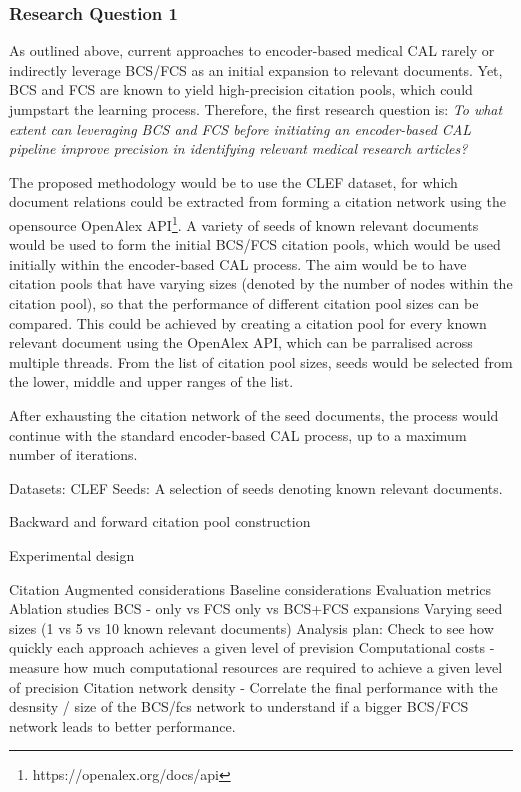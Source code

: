\documentclass[10pt, english]{article}
\begin{document}
\subsubsection{Research Question 1}

As outlined above, current approaches to encoder-based medical CAL rarely or indirectly leverage BCS/FCS as an initial expansion to relevant documents. Yet, BCS and FCS are known to yield high-precision citation pools, which could jumpstart the learning process. Therefore, the first research question is: {\it{To what extent can leveraging BCS and FCS before initiating an encoder-based CAL pipeline improve precision in identifying relevant medical research articles?}}

The proposed methodology would be to use the CLEF dataset, for which document relations could be extracted from forming a citation network using the opensource OpenAlex API\footnote{https://openalex.org/docs/api}. A variety of seeds of known relevant documents would be used to form the initial BCS/FCS citation pools, which would be used initially within the encoder-based CAL process. The aim would be to have citation pools that have varying sizes (denoted by the number of nodes within the citation pool), so that the performance of different citation pool sizes can be compared. This could be achieved by creating a citation pool for every known relevant document using the OpenAlex API, which can be parralised across multiple threads. From the list of citation pool sizes, seeds would be selected from the lower, middle and upper ranges of the list. 

After exhausting the citation network of the seed documents, the process would continue with the standard encoder-based CAL process, up to a maximum number of iterations. 



Datasets: CLEF
Seeds: A selection of seeds denoting known relevant documents.

Backward and forward citation pool construction


Experimental design

Citation Augmented considerations
Baseline considerations
Evaluation metrics
Ablation studies
BCS - only vs FCS only vs BCS+FCS expansions
Varying seed sizes (1 vs 5 vs 10 known relevant documents)
Analysis plan: 
Check to see how quickly each approach achieves a given level of prevision
Computational costs - measure how much computational resources are required to achieve a given level of precision
Citation network density - Correlate the final performance with the desnsity / size of the BCS/fcs network to understand if a bigger BCS/FCS network leads to better performance.
\end{document}

